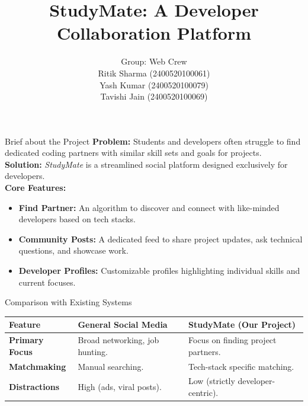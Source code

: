 \documentclass[11pt, aspectratio=169]{beamer} %
\title[StudyMate (Mini-Project)]{StudyMate: A Developer Collaboration Platform}
\subtitle{}
\author[Web Crew]{Group: Web Crew \\ \vspace{0.5cm} \small Ritik Sharma (2400520100061) \\ Yash Kumar (2400520100079) \\ Tavishi Jain (2400520100069)}
\institute[]{INC - 454}
\date{}
\begin{document}
\begin{frame}
    \titlepage
\end{frame}

\begin{frame}{Brief about the Project}
    \textbf{Problem:} Students and developers often struggle to find dedicated coding partners with similar skill sets and goals for projects. \\ \vspace{0.5cm}
    \textbf{Solution:} \textit{StudyMate} is a streamlined social platform designed exclusively for developers. \\ \vspace{0.3cm}
    \textbf{Core Features:}
    \begin{itemize}
        \item \textbf{Find Partner:} An algorithm to discover and connect with like-minded developers based on tech stacks.
        \item \textbf{Community Posts:} A dedicated feed to share project updates, ask technical questions, and showcase work.
        \item \textbf{Developer Profiles:} Customizable profiles highlighting individual skills and current focuses.
    \end{itemize}
\end{frame}

\begin{frame}{Comparison with Existing Systems}
    \begin{table}
        \centering
        \renewcommand{\arraystretch}{1.6} 
        \begin{tabular}{@{} p{2.5cm} p{5cm} p{5cm} @{}} %
            \toprule
            \textbf{Feature} & \textbf{General Social Media} & \textbf{StudyMate (Our Project)} \\ 
            \midrule
            \textbf{Primary Focus} & Broad networking, job hunting. & Focus on finding project partners. \\ 
            \textbf{Matchmaking} & Manual searching. & Tech-stack specific matching. \\ 
            \textbf{Distractions} & High (ads, viral posts). & Low (strictly developer-centric). \\ 
            \bottomrule
        \end{tabular}
    \end{table}
\end{frame}
\end{document}
